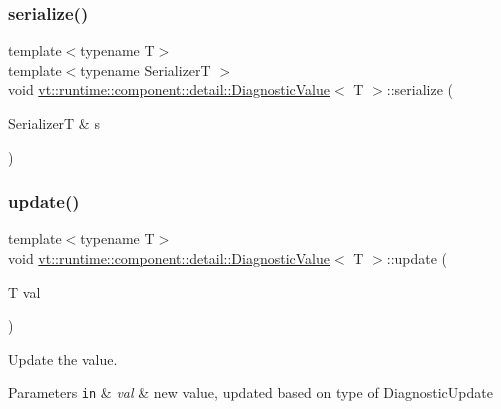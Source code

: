\subsubsection{\texorpdfstring{serialize()}{serialize()}}
{\footnotesize\ttfamily template$<$typename T$>$ \\
template$<$typename SerializerT $>$ \\
void \hyperlink{structvt_1_1runtime_1_1component_1_1detail_1_1_diagnostic_value}{vt\+::runtime\+::component\+::detail\+::\+Diagnostic\+Value}$<$ T $>$\+::serialize (\begin{DoxyParamCaption}\item[{SerializerT \&}]{s }\end{DoxyParamCaption})\hspace{0.3cm}{\ttfamily [inline]}}

\mbox{\label{structvt_1_1runtime_1_1component_1_1detail_1_1_diagnostic_value_a7d976c2d528e5780520ee1f1b8dfddb9}} 
\subsubsection{\texorpdfstring{update()}{update()}}
{\footnotesize\ttfamily template$<$typename T$>$ \\
void \hyperlink{structvt_1_1runtime_1_1component_1_1detail_1_1_diagnostic_value}{vt\+::runtime\+::component\+::detail\+::\+Diagnostic\+Value}$<$ T $>$\+::update (\begin{DoxyParamCaption}\item[{T}]{val }\end{DoxyParamCaption})\hspace{0.3cm}{\ttfamily [inline]}}



Update the value. 


\begin{DoxyParams}[1]{Parameters}
\mbox{\tt in}  & {\em val} & new value, updated based on type of {\ttfamily Diagnostic\+Update} \\
\hline
\end{DoxyParams}
\mbox{\label{structvt_1_1runtime_1_1component_1_1detail_1_1_diagnostic_value_afb539e5bf7b2a7cc09298f731c6705a3}} 
